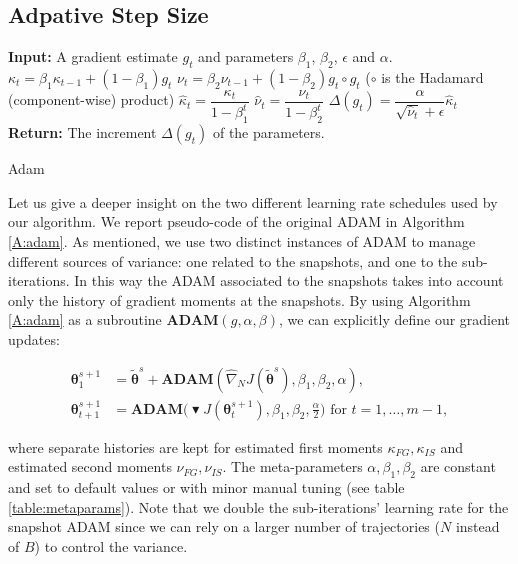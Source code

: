 \documentclass{article}
\theoremstyle{remark}
\theoremstyle{definition}
\newcommand{\vtheta}{\boldsymbol{\theta}}
\newcommand{\wt}[1]{\widetilde{#1}}
\newcommand{\wh}[1]{\widehat{#1}}
\begin{document}
\subsection{Adpative Step Size}
\begin{algorithm}[h]
	\begin{algorithmic}
		\STATE \textbf{Input:} A gradient estimate $g_t$ and parameters $\beta_1$, $\beta_2$, $\epsilon$ and $\alpha$.
		\STATE $\kappa_t = \beta_1 \kappa_{t-1} + (1 - \beta_1) g_t$
		\STATE $\nu_t = \beta_2 \nu_{t-1} + (1 - \beta_2) g_t \circ g_t$ ($\circ$ is the Hadamard (component-wise) product)
		\STATE $\hat{\kappa}_t = \dfrac{\kappa_t}{1 - \beta^t_1}$
		\STATE $\hat{\nu}_t = \dfrac{\nu_t}{1 - \beta^t_2}$
		\STATE $\Delta(g_t) = \dfrac{\alpha}{\sqrt{\hat{\nu}_t} + \epsilon} \hat{\kappa}_t$
		\STATE \textbf{Return:} The increment $\Delta(g_t)$  of the parameters.
	\end{algorithmic}
	\caption{
		\label{A:adam}
		Adam}
\end{algorithm}
Let us give a deeper insight on the two different learning rate schedules used by our algorithm. We report pseudo-code of the original ADAM \cite{kingma2014adam} in Algorithm \ref{A:adam}. As mentioned, we use two distinct instances of ADAM to manage different sources of variance: one related to the snapshots, and one to the sub-iterations. In this way the ADAM associated to the snapshots takes into account only the history of gradient moments at the snapshots. By using Algorithm \ref{A:adam} as a subroutine $\textbf{ADAM}(g,\alpha,\beta)$, we can explicitly define our gradient updates:

\begin{align*}
\vtheta^{s+1}_1 &= \wt{\vtheta}^s + \textbf{ADAM}\left(\wh{\nabla}_N J(\wt{\vtheta}^s),\beta_1,\beta_2,\alpha\right),\\
\vtheta^{s+1}_{t+1} &= \textbf{ADAM}\Big( 
\blacktriangledown J(\vtheta^{s+1}_t),\beta_1,\beta_2,\frac{\alpha}{2}\Big)
\text{ for $t=1,\dots,m-1$},
\end{align*}

where separate histories are kept for estimated first moments $\kappa_{FG},\kappa_{IS}$ and estimated second moments $\nu_{FG},\nu_{IS}$.
The meta-parameters $\alpha,\beta_1,\beta_2$ are constant and set to default values or with minor manual tuning (see table \ref{table:metaparams}). Note that we double the sub-iterations' learning rate for the snapshot ADAM since we can rely on a larger number of trajectories ($N$ instead of $B$) to control the variance. 
\end{document}
